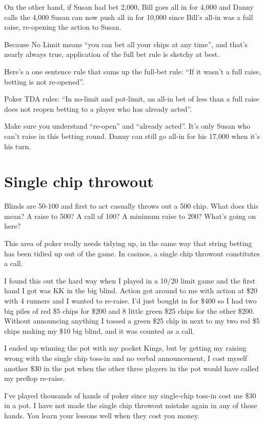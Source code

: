 On the other hand, if Susan had bet 2,000, Bill goes all in for 4,000
and Danny calls the 4,000 Susan can now push all in for 10,000 since
Bill's all-in was a full raise, re-opening the action to Susan.

Because No Limit means ``you can bet all your chips at any time'', and
that's nearly always true, application of the full bet rule is sketchy
at best.

Here's a one sentence rule that sums up the full-bet rule:
``If it wasn't a full raise, betting is not re-opened''.

Poker TDA rules: ``In no-limit and pot-limit, an all-in bet of less
than a full raise does not reopen betting to a player who has already
acted''.

Make sure you understand ``re-open'' and ``already acted''. It's only
Susan who can't raise in this betting round. Danny can still go all-in for
his 17,000 when it's his turn.

\section{Single chip throwout}

Blinds are 50-100 and first to act casually throws out a 500 chip.
What does this mean? A raise to 500? A call of 100? A minimum raise
to 200? What's going on here?

This area of poker really needs tidying up, in the same way that
string betting has been tidied up out of the game. In casinos, a
single chip throwout constitutes a call.

I found this out the hard way when I played in a 10/20 limit game
and the first hand I got was KK in the big blind. Action got around
to me with action at \$20 with 4 runners and I wanted to re-raise. I'd
just bought in for \$400 so I had two big piles of red \$5 chips
for \$200 and 8 little green \$25 chips for the other \$200. Without
announcing anything I tossed a green \$25 chip in next to my two red
\$5 chips making my \$10 big blind, and it was counted as a call.

I ended up winning the pot with my pocket Kings, but by getting my
raising wrong with the single chip toss-in and no verbal announcement,
I cost myself another \$30 in the pot when the other three players
in the pot would have called my preflop re-raise.

I've played thousands of hands of poker since my single-chip toss-in
cost me \$30 in a pot. I have not made the single chip throwout mistake 
again in any of those hands. You learn your lessons well when they cost 
you money.

